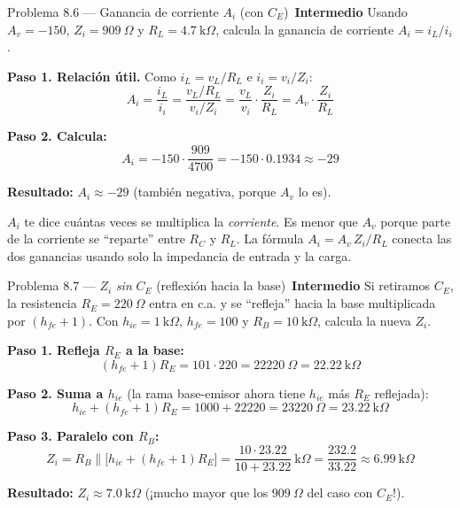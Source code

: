 \documentclass[11pt,a4paper]{article}
\newcommand{\intermedio}{\textcolor{naranjaVivo}{\faIcon{circle}\,\textbf{Intermedio}}}
\begin{document}
\begin{problemaBox}{Problema 8.6 --- Ganancia de corriente $A_i$ (con $C_E$) \quad \intermedio}
Usando $A_v=-150$, $Z_i=909\ \Omega$ y $R_L=4.7\ \text{k}\Omega$, calcula la ganancia de corriente $A_i=i_L/i_i$.
\end{problemaBox}

\begin{solucionBox}
\textbf{Paso 1. Relación útil.} Como $i_L=v_L/R_L$ e $i_i=v_i/Z_i$:
\[
A_i=\frac{i_L}{i_i}=\frac{v_L/R_L}{v_i/Z_i}=\frac{v_L}{v_i}\cdot\frac{Z_i}{R_L}=A_v\cdot\frac{Z_i}{R_L}
\]

\textbf{Paso 2. Calcula:}
\[
A_i=-150\cdot\frac{909}{4700}=-150\cdot0.1934\approx-29
\]

\textbf{Resultado:} $A_i\approx-29$ (también negativa, porque $A_v$ lo es).
\end{solucionBox}

\begin{porqueBox}
$A_i$ te dice cuántas veces se multiplica la \emph{corriente}. Es menor que $A_v$ porque parte de la corriente se ``reparte'' entre $R_C$ y $R_L$. La fórmula $A_i=A_v\,Z_i/R_L$ conecta las dos ganancias usando solo la impedancia de entrada y la carga.
\end{porqueBox}

\begin{problemaBox}{Problema 8.7 --- $Z_i$ \emph{sin} $C_E$ (reflexión hacia la base) \quad \intermedio}
Si retiramos $C_E$, la resistencia $R_E=220\ \Omega$ entra en c.a. y se ``refleja'' hacia la base multiplicada por $(h_{fe}+1)$. Con $h_{ie}=1\ \text{k}\Omega$, $h_{fe}=100$ y $R_B=10\ \text{k}\Omega$, calcula la nueva $Z_i$.
\end{problemaBox}

\begin{solucionBox}
\textbf{Paso 1. Refleja $R_E$ a la base:}
\[
(h_{fe}+1)R_E=101\cdot220=22220\ \Omega=22.22\ \text{k}\Omega
\]

\textbf{Paso 2. Suma a $h_{ie}$} (la rama base-emisor ahora tiene $h_{ie}$ más $R_E$ reflejada):
\[
h_{ie}+(h_{fe}+1)R_E=1000+22220=23220\ \Omega=23.22\ \text{k}\Omega
\]

\textbf{Paso 3. Paralelo con $R_B$:}
\[
Z_i=R_B\parallel\bigl[h_{ie}+(h_{fe}+1)R_E\bigr]=\frac{10\cdot23.22}{10+23.22}\ \text{k}\Omega=\frac{232.2}{33.22}\approx6.99\ \text{k}\Omega
\]

\textbf{Resultado:} $Z_i\approx7.0\ \text{k}\Omega$ (¡mucho mayor que los $909\ \Omega$ del caso con $C_E$!).
\end{solucionBox}
\end{document}
